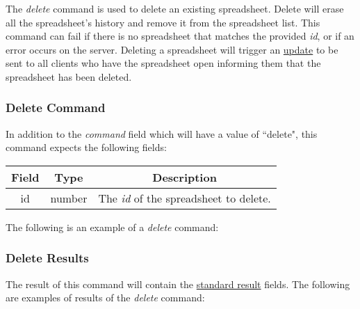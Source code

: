 The \emph{delete} command is used to delete an existing spreadsheet. Delete will 
erase all the spreadsheet’s history and remove it from the spreadsheet list. 
This command can fail if there is no spreadsheet that matches the provided \emph{id}, 
or if an error occurs on the server. Deleting a spreadsheet will trigger an \hyperref[lst:update:delete]{update} 
to be sent to all clients who have the spreadsheet open informing them that 
the spreadsheet has been deleted.

\subsubsection{Delete Command}
In addition to the \emph{command} field which will have a value of ``delete", this command expects the following fields:

\begin{table}[H]
    \begin{center}
        \begin{tabular}{|c|c|c|}\hline
            Field & Type & Description \\\hline
            id & number & The \emph{id} of the spreadsheet to delete. \\\hline
        \end{tabular}
    \end{center}
\end{table}

The following is an example of a \emph{delete} command:



\subsubsection{Delete Results}
The result of this command will contain the \hyperref[sec:message:result]{standard result} fields.
The following are examples of results of the \emph{delete} command:





